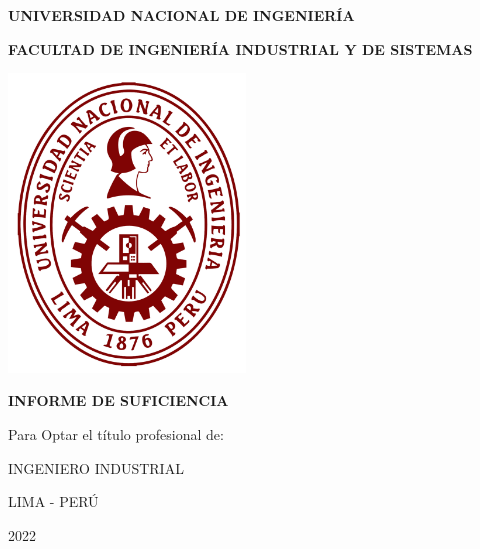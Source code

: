 
\begin{titlepage}
\begin{center}
    
{\huge\bf UNIVERSIDAD NACIONAL DE INGENIERÍA}
\vspace{4mm}

{\bf\Large FACULTAD DE INGENIERÍA INDUSTRIAL Y DE SISTEMAS }
\vspace{8mm}

\includegraphics[width = 6.3cm]{UNI.png}
\vspace{5mm}

\begin{minipage}{0.8\textwidth}
    \centering
    \begin{spacing}{1.5}
        \Large\bf\newtitle
    \end{spacing}
\end{minipage}
\vspace{5mm}

{\bf\Large
INFORME DE SUFICIENCIA
\vspace{2mm}

Para Optar el título profesional de:
\vspace{5mm}

INGENIERO INDUSTRIAL
\vspace{6mm}

\newauthor
\vspace{5mm}

LIMA - PERÚ 
\vspace{2mm}

2022}
\end{center}
\end{titlepage}